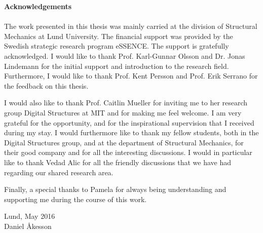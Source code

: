 \null\vfill

{\Huge \textbf{Acknowledgements}} \\ \\

The work presented in this thesis was mainly carried at the division of Structural Mechanics at Lund University. The financial support was provided by the Swedish strategic research program eSSENCE. The support is gratefully acknowledged. I would like to thank Prof. Karl-Gunnar Olsson and Dr. Jonas Lindemann for the initial support and introduction to the research field. Furthermore, I would like to thank Prof. Kent Persson and Prof. Erik Serrano for the feedback on this thesis.

I would also like to thank Prof. Caitlin Mueller for inviting me to her research group Digital Structures at MIT and for making me feel welcome. I am very grateful for the opportunity, and for the inspirational supervision that I received during my stay. I would furthermore like to thank my fellow students, both in the Digital Structures group, and at the department of Structural Mechanics, for their good company and for all the interesting discussions. I would in particular like to thank Vedad Alic for all the friendly discussions that we have had regarding our shared research area.

Finally, a special thanks to Pamela for always being understanding and supporting me during the course of this work.


\vspace{1cm}

\begin{flushright}
Lund, May 2016\\Daniel Åkesson
\end{flushright}

\vfill\vfill\vfill\vfill\null